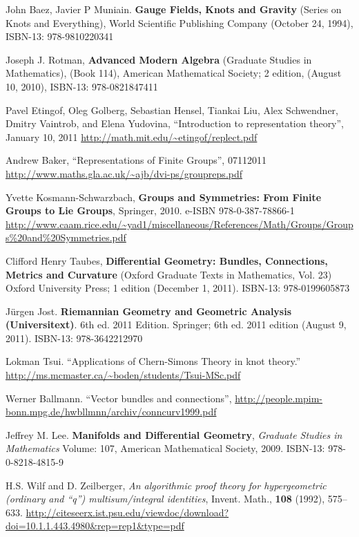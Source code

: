 \documentclass[10pt]{amsart}
\begin{document}
\begin{thebibliography}{9}

John Baez, Javier P Muniain.  \textbf{Gauge Fields, Knots and Gravity} (Series on Knots and Everything), World Scientific Publishing Company (October 24, 1994), ISBN-13: 978-9810220341

Joseph J. Rotman, \textbf{Advanced Modern Algebra} (Graduate Studies in Mathematics), (Book 114), American Mathematical Society; 2 edition, (August 10, 2010), ISBN-13: 978-0821847411

Pavel Etingof, Oleg Golberg, Sebastian Hensel, Tiankai Liu, Alex Schwendner, Dmitry Vaintrob, and Elena Yudovina, ``Introduction to representation theory'', January 10, 2011
\url{http://math.mit.edu/~etingof/replect.pdf}

Andrew Baker, ``Representations of Finite Groups'', 07112011
\url{http://www.maths.gla.ac.uk/~ajb/dvi-ps/groupreps.pdf}

Yvette Kosmann-Schwarzbach, \textbf{Groups and Symmetries: From Finite Groups to Lie Groups}, Springer, 2010. e-ISBN 978-0-387-78866-1 \url{http://www.caam.rice.edu/~yad1/miscellaneous/References/Math/Groups/Groups\%20and\%20Symmetries.pdf}

Clifford Henry Taubes, \textbf{Differential Geometry: Bundles, Connections, Metrics and Curvature} (Oxford Graduate Texts in Mathematics, Vol. 23) Oxford University Press; 1 edition (December 1, 2011). ISBN-13: 978-0199605873

J\"{u}rgen Jost. \textbf{Riemannian Geometry and Geometric Analysis (Universitext)}. 6th ed. 2011 Edition.  Springer; 6th ed. 2011 edition (August 9, 2011).  ISBN-13: 978-3642212970

Lokman Tsui.  ``Applications of Chern-Simons Theory in knot theory.'' \url{http://ms.mcmaster.ca/~boden/students/Tsui-MSc.pdf}

Werner Ballmann. ``Vector bundles and connections'', \url{http://people.mpim-bonn.mpg.de/hwbllmnn/archiv/conncurv1999.pdf}

Jeffrey M. Lee. \textbf{Manifolds and Differential Geometry}, \emph{Graduate Studies in Mathematics} Volume: 107, American Mathematical Society, 2009. ISBN-13: 978-0-8218-4815-9

H.S. Wilf and D. Zeilberger, \emph{An algorithmic proof theory for hypergeometric (ordinary and “q”) multisum/integral identities}, Invent. Math., \textbf{108} (1992), 575–633.  \url{http://citeseerx.ist.psu.edu/viewdoc/download?doi=10.1.1.443.4980&rep=rep1&type=pdf}


\end{thebibliography}
\end{document}
